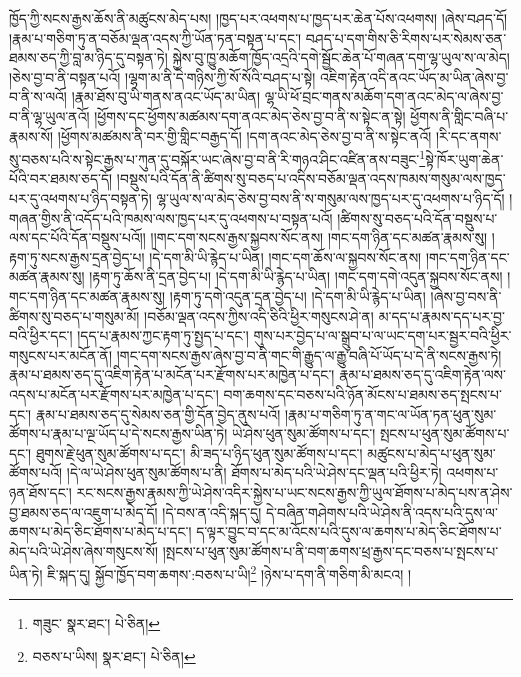 ཁྱོད་ཀྱི་སངས་རྒྱས་ཆོས་ནི་མཚུངས་མེད་པས། །ཁྱད་པར་འཕགས་པ་ཁྱད་པར་ཆེན་པོས་འཕགས། །ཞེས་བཤད་དོ། །རྣམ་པ་གཅིག་ཏུ་ན་བཅོམ་ལྡན་འདས་ཀྱི་ཡོན་ཏན་བསྟན་པ་དང་། བཤད་པ་དག་གིས་ཅི་རིགས་པར་སེམས་ཅན་ཐམས་ཅད་ཀྱི་བླ་མ་ཉིད་དུ་བསྟན་ཏེ། སྐྱེས་བུ་ཁྱུ་མཆོག་ཁྱོད་འདྲའི་དགེ་སྦྱོང་ཆེན་པོ་གཞན་དག་ལྷ་ཡུལ་ས་ལ་མེད། །ཅེས་བྱ་བ་ནི་བསྟན་པའོ། །ལྷག་མ་ནི་དེ་གཉིས་ཀྱི་སོ་སོའི་བཤད་པ་སྟེ། འཇིག་རྟེན་འདི་ནའང་ཡོད་མ་ཡིན་ཞེས་བྱ་བ་ནི་ས་ལའོ། །རྣམ་ཐོས་བུ་ཡི་གནས་ནའང་ཡོད་མ་ཡིན། ལྷ་ཡི་ཕོ་བྲང་གནས་མཆོག་དག་ནའང་མེད་ལ་ཞེས་བྱ་བ་ནི་ལྷ་ཡུལ་ནའོ། །ཕྱོགས་དང་ཕྱོགས་མཚམས་དག་ནའང་མེད་ཅེས་བྱ་བ་ནི་ས་སྟེང་ན་སྟེ། ཕྱོགས་ནི་གླིང་བཞི་པ་རྣམས་སོ། །ཕྱོགས་མཚམས་ནི་བར་གྱི་གླིང་བརྒྱད་དོ། །དག་ནའང་མེད་ཅེས་བྱ་བ་ནི་ས་སྟེང་ནའོ། །རི་དང་ནགས་སུ་བཅས་པའི་ས་སྟེང་རྒྱས་པ་ཀུན་དུ་བསྐོར་ཡང་ཞེས་བྱ་བ་ནི་རི་གཉའ་ཤིང་འཛིན་ནས་བཟུང་\footnote{གཟུང་  སྣར་ཐང་།  པེ་ཅིན། }སྟེ་ཁོར་ཡུག་ཆེན་པོའི་བར་ཐམས་ཅད་དོ། །བསྡུས་པའི་དོན་ནི་ཚིགས་སུ་བཅད་པ་འདིས་བཅོམ་ལྡན་འདས་ཁམས་གསུམ་ལས་ཁྱད་པར་དུ་འཕགས་པ་ཉིད་བསྟན་ཏེ། ལྷ་ཡུལ་ས་ལ་མེད་ཅེས་བྱ་བས་ནི་ས་གསུམ་ལས་ཁྱད་པར་དུ་འཕགས་པ་ཉིད་དོ། །གཞན་གྱིས་ནི་འདོད་པའི་ཁམས་ལས་ཁྱད་པར་དུ་འཕགས་པ་བསྟན་པའོ། །ཚིགས་སུ་བཅད་པའི་དོན་བསྡུས་པ་ལས་དང་པོའི་དོན་བསྡུས་པའོ།། །།གང་དག་སངས་རྒྱས་སྐྱབས་སོང་ནས། །གང་དག་ཉིན་དང་མཚན་རྣམས་སུ། །རྟག་ཏུ་སངས་རྒྱས་དྲན་བྱེད་པ། །དེ་དག་མི་ཡི་རྙེད་པ་ཡིན། །གང་དག་ཆོས་ལ་སྐྱབས་སོང་ནས། །གང་དག་ཉིན་དང་མཚན་རྣམས་སུ། །རྟག་ཏུ་ཆོས་ནི་དྲན་བྱེད་པ། །དེ་དག་མི་ཡི་རྙེད་པ་ཡིན། །གང་དག་དགེ་འདུན་སྐྱབས་སོང་ནས། །གང་དག་ཉིན་དང་མཚན་རྣམས་སུ། །རྟག་ཏུ་དགེ་འདུན་དྲན་བྱེད་པ། །དེ་དག་མི་ཡི་རྙེད་པ་ཡིན། །ཞེས་བྱ་བས་ནི་ཚིགས་སུ་བཅད་པ་གསུམ་མོ། །བཅོམ་ལྡན་འདས་ཀྱིས་འདི་ཅིའི་ཕྱིར་གསུངས་ཤེ་ན། མ་དད་པ་རྣམས་དད་པར་བྱ་བའི་ཕྱིར་དང་། །དད་པ་རྣམས་ཀྱང་རྟག་ཏུ་སྤྱད་པ་དང་། གུས་པར་བྱེད་པ་ལ་སྒྲུབ་པ་ལ་ཡང་དག་པར་སྦྱར་བའི་ཕྱིར་གསུངས་པར་མངོན་ནོ། །གང་དག་སངས་རྒྱས་ཞེས་བྱ་བ་ནི་གང་གི་རྒྱུད་ལ་རྒྱུ་བཞི་པོ་ཡོད་པ་དེ་ནི་སངས་རྒྱས་ཏེ། རྣམ་པ་ཐམས་ཅད་དུ་འཇིག་རྟེན་པ་མངོན་པར་རྫོགས་པར་མཁྱེན་པ་དང་། རྣམ་པ་ཐམས་ཅད་དུ་འཇིག་རྟེན་ལས་འདས་པ་མངོན་པར་རྫོགས་པར་མཁྱེན་པ་དང་། བག་ཆགས་དང་བཅས་པའི་ཉོན་མོངས་པ་ཐམས་ཅད་སྤངས་པ་དང་། རྣམ་པ་ཐམས་ཅད་དུ་སེམས་ཅན་གྱི་དོན་བྱེད་ནུས་པའོ། །རྣམ་པ་གཅིག་ཏུ་ན་གང་ལ་ཡོན་ཏན་ཕུན་སུམ་ཚོགས་པ་རྣམ་པ་ལྔ་ཡོད་པ་དེ་སངས་རྒྱས་ཡིན་ཏེ། ཡེ་ཤེས་ཕུན་སུམ་ཚོགས་པ་དང་། སྤངས་པ་ཕུན་སུམ་ཚོགས་པ་དང་། ཐུགས་རྗེ་ཕུན་སུམ་ཚོགས་པ་དང་། མི་ཟད་པ་ཉིད་ཕུན་སུམ་ཚོགས་པ་དང་། མཚུངས་པ་མེད་པ་ཕུན་སུམ་ཚོགས་པའོ། །དེ་ལ་ཡེ་ཤེས་ཕུན་སུམ་ཚོགས་པ་ནི། ཐོགས་པ་མེད་པའི་ཡེ་ཤེས་དང་ལྡན་པའི་ཕྱིར་ཏེ། འཕགས་པ་ཉན་ཐོས་དང་། རང་སངས་རྒྱས་རྣམས་ཀྱི་ཡེ་ཤེས་འདིར་སྐྱེས་པ་ཡང་སངས་རྒྱས་ཀྱི་ཡུལ་ཐོགས་པ་མེད་པས་ན་ཤེས་བྱ་ཐམས་ཅད་ལ་འཇུག་པ་མེད་དོ། །དེ་བས་ན་འདི་སྐད་དུ། དེ་བཞིན་གཤེགས་པའི་ཡེ་ཤེས་ནི་འདས་པའི་དུས་ལ་ཆགས་པ་མེད་ཅིང་ཐོགས་པ་མེད་པ་དང་། ད་ལྟར་བྱུང་བ་དང་མ་འོངས་པའི་དུས་ལ་ཆགས་པ་མེད་ཅིང་ཐོགས་པ་མེད་པའི་ཡེ་ཤེས་ཞེས་གསུངས་སོ། །སྤངས་པ་ཕུན་སུམ་ཚོགས་པ་ནི་བག་ཆགས་ཕྲ་རྒྱས་དང་བཅས་པ་སྤངས་པ་ཡིན་ཏེ། ཇི་སྐད་དུ། སྐྱོབ་ཁྱོད་བག་ཆགས་:བཅས་པ་ཡི།\footnote{བཅས་པ་ཡིས།  སྣར་ཐང་།  པེ་ཅིན། } །ཉེས་པ་དག་ནི་གཅིག་མི་མངའ། །
